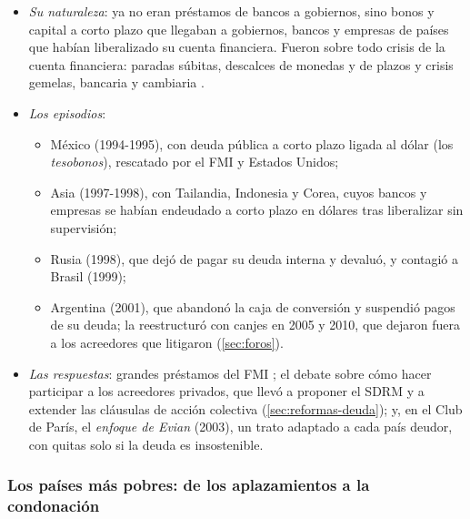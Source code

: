 \documentclass[11pt]{article}
\begin{document}
\begin{itemize}
\item \emph{Su naturaleza}: ya no eran préstamos de bancos a gobiernos, sino bonos y capital a corto plazo que llegaban a gobiernos, bancos y empresas de países que habían liberalizado su cuenta financiera. Fueron sobre todo crisis de la cuenta financiera: paradas súbitas, descalces de monedas y de plazos y crisis gemelas, bancaria y cambiaria .
\item \emph{Los episodios}:
  \begin{itemize}
  \item México (1994-1995), con deuda pública a corto plazo ligada al dólar (los \emph{tesobonos}), rescatado por el FMI y Estados Unidos;
  \item Asia (1997-1998), con Tailandia, Indonesia y Corea, cuyos bancos y empresas se habían endeudado a corto plazo en dólares tras liberalizar sin supervisión;
  \item Rusia (1998), que dejó de pagar su deuda interna y devaluó, y contagió a Brasil (1999);
  \item Argentina (2001), que abandonó la caja de conversión y suspendió pagos de su deuda; la reestructuró con canjes en 2005 y 2010, que dejaron fuera a los acreedores que litigaron\nocite{CrucesTrebesch2013} (\ref{sec:foros}).
  \end{itemize}
\item \emph{Las respuestas}: grandes préstamos del FMI ; el debate sobre cómo hacer participar a los acreedores privados, que llevó a proponer el SDRM y a extender las cláusulas de acción colectiva (\ref{sec:reformas-deuda}); y, en el Club de París, el \emph{enfoque de Evian} (2003), un trato adaptado a cada país deudor, con quitas solo si la deuda es insostenible\nocite{ClubParis2026Miembros,ReinhartRogoff2009This}.
\end{itemize}

\subsubsection{Los países más pobres: de los aplazamientos a la condonación}\label{sec:ppme}
\end{document}
